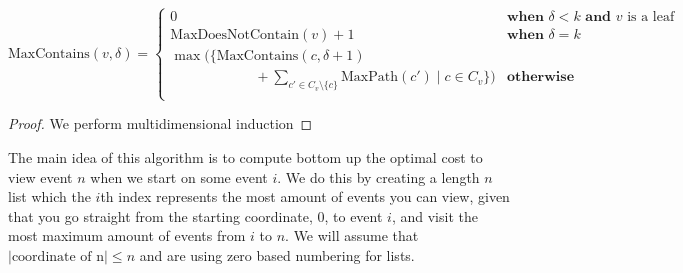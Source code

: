 \documentclass[11pt]{scrartcl}
\newcommand{\maxp}{\text{MaxPath}}
\newcommand{\ctn}{\text{MaxContains}}
\newcommand{\dctn}{\text{MaxDoesNotContain}}
\begin{document}
$$
\ctn(v,\delta) = 
\begin{cases} 
	0 & \textbf{when } \delta < k \textbf{ and } v \text{ is a leaf}\\
	\dctn(v) + 1& \textbf{when } \delta = k\\
	\max\bigg(\Big\{
		\ctn(c,\delta + 1) \\  
		\qquad \qquad \qquad
		+ \displaystyle\sum_{c' \in C_v \setminus \{c\}} \maxp(c') \mid c \in C_v
		\Big\}\bigg)& \textbf{otherwise}\\ 
\end{cases}
$$

\begin{proof}
We perform multidimensional induction 	
\end{proof}



























\iffalse
	The main idea of this algorithm is to compute bottom up the optimal cost to view event $n$
	when we start on some event $i$. We do this by creating a length $n$ list which the $i$th index represents the
	most amount of events you can view, given that you go straight from the starting coordinate, 0,
	to event $i$, and visit the most maximum amount of events from $i$ to $n$.
	We will assume that $|\text{coordinate of n}| \leq n$ and are using zero based numbering for lists.

	\begin{algorithm}
	\end{algorithm}
\end{document}
